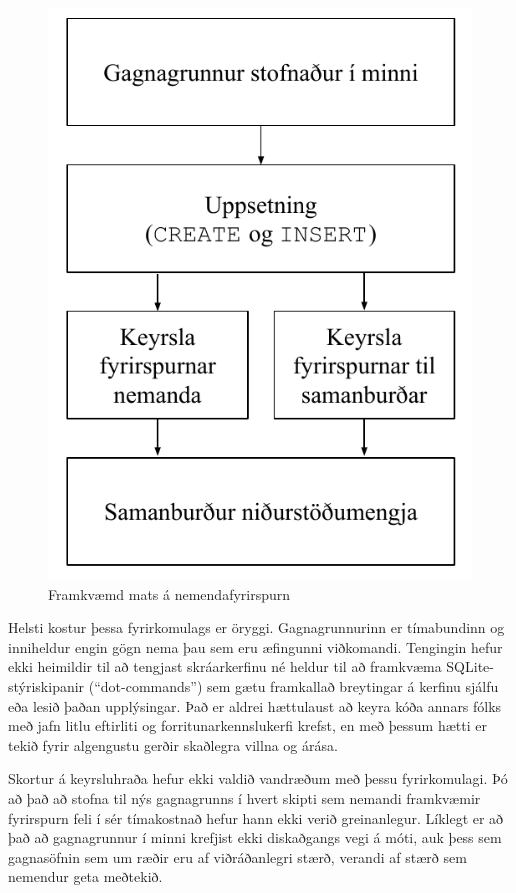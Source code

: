 \documentclass[a4paper,12pt,twoside,BCOR=10mm]{scrbook}
\begin{document}
\begin{figure}
\caption{Framkvæmd mats á nemendafyrirspurn}
\label{fig:sql-evaluation-execution}
\begin{center}
\includegraphics{KeyrslaFyrirspurnar}
\end{center}
\end{figure}

Helsti kostur þessa fyrirkomulags er öryggi. Gagnagrunnurinn er tímabundinn og inniheldur engin gögn nema þau sem eru æfingunni viðkomandi. Tengingin hefur ekki heimildir til að tengjast skráarkerfinu né heldur til að framkvæma SQLite-stýriskipanir (``dot-commands'') sem gætu framkallað breytingar á kerfinu sjálfu eða lesið þaðan upplýsingar. Það er aldrei hættulaust að keyra kóða annars fólks með jafn litlu eftirliti og forritunarkennslukerfi krefst, en með þessum hætti er tekið fyrir algengustu gerðir skaðlegra villna og árása.

Skortur á keyrsluhraða hefur ekki valdið vandræðum með þessu fyrirkomulagi. Þó að það að stofna til nýs gagnagrunns í hvert skipti sem nemandi framkvæmir fyrirspurn feli í sér tímakostnað hefur hann ekki verið greinanlegur. Líklegt er að það að gagnagrunnur í minni krefjist ekki diskaðgangs vegi á móti, auk þess sem gagnasöfnin sem um ræðir eru af viðráðanlegri stærð, verandi af stærð sem nemendur geta meðtekið.
\end{document}
